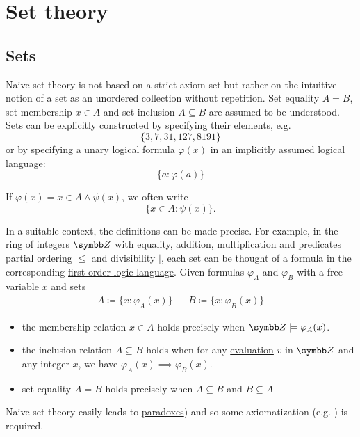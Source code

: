 \section{Set theory}\label{sec:set_theory}
\subsection{Sets}\label{subsec:sets}

\begin{definition}\label{def:set_naive}\cite[chapter 1]{Enderton1977}
  Naive set theory is not based on a strict axiom set but rather on the intuitive notion of a set as an unordered collection without repetition. Set equality \( A = B \), set membership \( x \in A \) and set inclusion \( A \subseteq B \) are assumed to be understood. Sets can be explicitly constructed by specifying their elements, e.g.
  \begin{equation*}
    \{ 3, 7, 31, 127, 8191 \}
  \end{equation*}
  or by specifying a unary logical \hyperref[def:first_order_formula]{formula} \( \varphi(x) \) in an implicitly assumed logical language:
  \begin{equation*}
    \{ a \colon \varphi(a) \}
  \end{equation*}

  If \( \varphi(x) = x \in A \land \psi(x) \), we often write
  \begin{equation*}
    \{ x \in A \colon \psi(x) \}.
  \end{equation*}

  In a suitable context, the definitions can be made precise. For example, in the ring of integers \( \BZ \) with equality, addition, multiplication and predicates partial ordering \( \leq \) and divisibility \( \vert \), each set can be thought of a formula in the corresponding \hyperref[def:first_order_logic_language]{first-order logic language}. Given formulas \( \varphi_A \) and \( \varphi_B \) with a free variable \( x \) and sets
  \begin{align*}
    A \coloneqq \{ x \colon \varphi_A(x) \} && B \coloneqq \{ x \colon \varphi_B(x) \}
  \end{align*}

  \begin{itemize}
    \item the membership relation \( x \in A \) holds precisely when \( \BZ \models \varphi_A(x) \).

    \item the inclusion relation \( A \subseteq B \) holds when for any \hyperref[def:first_order_variable_assignment]{evaluation} \( v \) in \( \BZ \) and any integer \( x \), we have \( \varphi_A(x) \implies \varphi_B(x) \).

    \item set equality \( A = B \) holds precisely when \( A \subseteq B \) and \( B \subseteq A \)
  \end{itemize}

  Naive set theory easily leads to \hyperref[ex:russels_paradox_sets]{paradoxes}) and so some axiomatization (e.g. ) is required.
\end{definition}

